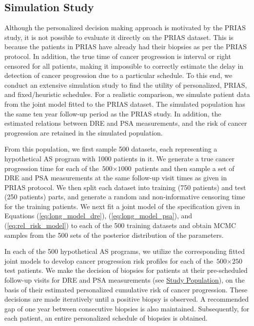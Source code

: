 \documentclass[a4paper, 12pt]{article}
\begin{document}
\subsection{Simulation Study}
\label{subsec:sim_study}
Although the personalized decision making approach is motivated by the PRIAS study, it is not possible to evaluate it directly on the PRIAS dataset. This is because the patients in PRIAS have already had their biopsies as per the PRIAS protocol. In addition, the true time of cancer progression is interval or right censored for all patients, making it impossible to correctly estimate the delay in detection of cancer progression due to a particular schedule. To this end, we conduct an extensive simulation study to find the utility of personalized, PRIAS, and fixed/heuristic schedules. For a realistic comparison, we simulate patient data from the joint model fitted to the PRIAS dataset. The simulated population has the same ten year follow-up period as the PRIAS study. In addition, the estimated relations between DRE and PSA measurements, and the risk of cancer progression are retained in the simulated population.

From this population, we first sample 500 datasets, each representing a hypothetical AS program with 1000 patients in it. We generate a true cancer progression time for each of the ${\mbox{500} \times \mbox{1000}}$ patients and then sample a set of DRE and PSA measurements at the same follow-up visit times as given in PRIAS protocol. We then split each dataset into training (750 patients) and test (250 patients) parts, and generate a random and non‐informative censoring time for the training patients. We next fit a joint model of the specification given in Equations (\ref{eq:long_model_dre}), (\ref{eq:long_model_psa}), and (\ref{eq:rel_risk_model}) to each of the 500 training datasets and obtain MCMC samples from the 500 sets of the posterior distribution of the parameters. 

In each of the 500 hypothetical AS programs, we utilize the corresponding fitted joint models to develop cancer progression risk profiles for each of the ${\mbox{500} \times \mbox{250}}$ test patients. We make the decision of biopsies for patients at their pre-scheduled follow-up visits for DRE and PSA measurements (see \hyperref[subsec:study_population]{Study Population}), on the basis of their estimated personalized cumulative risk of cancer progression. These decisions are made iteratively until a positive biopsy is observed. A recommended gap of one year between consecutive biopsies \citep{bokhorst2015compliance} is also maintained. Subsequently, for each patient, an entire personalized schedule of biopsies is obtained.
\end{document}
